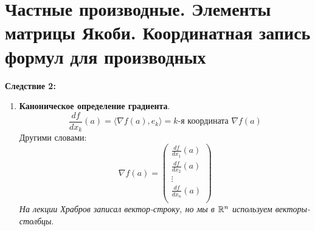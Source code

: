 \section{Частные производные. Элементы матрицы Якоби. Координатная запись формул для производных}


 
\textbf{Следствие 2:}
\begin{enumerate}
    \item[] \textbf{Каноническое определение градиента}.
    $$\frac{df}{dx_k}(a) = \langle \nabla f(a), e_k \rangle =
    \text{$k$-я координата } \nabla f(a)$$
    Другими словами:
    $$ \nabla f(a) =
    \begin{pmatrix*}
        \frac{df}{dx_1}(a) \\
        \frac{df}{dx_2}(a) \\
        \vdots \\
        \frac{df}{dx_n}(a) \\
    \end{pmatrix*}$$
    \textit{На лекции Храбров записал вектор-строку, но мы в $\mathbb{R}^n$ 
    используем векторы-столбцы}.
\end{enumerate}

